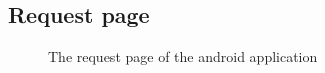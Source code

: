 \documentclass[11pt, a4paper]{article}
\begin{document}
\begin{appendices}
\subsection{Request page} %
\begin{figure}[ht]
\centering
{}
\caption{The request page of the android application}
\end{figure}
\clearpage



\end{appendices}
\end{document}

